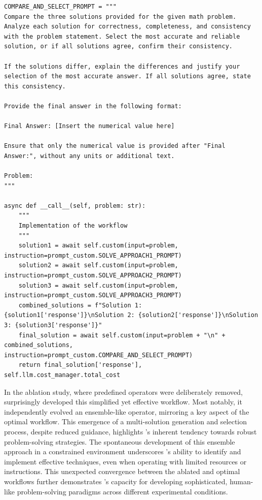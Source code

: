 \begin{tcolorbox}
\begin{verbatim}
COMPARE_AND_SELECT_PROMPT = """
Compare the three solutions provided for the given math problem. Analyze each solution for correctness, completeness, and consistency with the problem statement. Select the most accurate and reliable solution, or if all solutions agree, confirm their consistency.

If the solutions differ, explain the differences and justify your selection of the most accurate answer. If all solutions agree, state this consistency.

Provide the final answer in the following format:

Final Answer: [Insert the numerical value here]

Ensure that only the numerical value is provided after "Final Answer:", without any units or additional text.

Problem:
"""

async def __call__(self, problem: str):
    """
    Implementation of the workflow
    """
    solution1 = await self.custom(input=problem, instruction=prompt_custom.SOLVE_APPROACH1_PROMPT)
    solution2 = await self.custom(input=problem, instruction=prompt_custom.SOLVE_APPROACH2_PROMPT)
    solution3 = await self.custom(input=problem, instruction=prompt_custom.SOLVE_APPROACH3_PROMPT)
    combined_solutions = f"Solution 1: {solution1['response']}\nSolution 2: {solution2['response']}\nSolution 3: {solution3['response']}"
    final_solution = await self.custom(input=problem + "\n" + combined_solutions, instruction=prompt_custom.COMPARE_AND_SELECT_PROMPT)
    return final_solution['response'], self.llm.cost_manager.total_cost
\end{verbatim}
\end{tcolorbox}

In the ablation study, where predefined operators were deliberately removed, \model surprisingly developed this simplified yet effective workflow. Most notably, it independently evolved an ensemble-like operator, mirroring a key aspect of the optimal workflow. This emergence of a multi-solution generation and selection process, despite reduced guidance, highlights \model's inherent tendency towards robust problem-solving strategies. The spontaneous development of this ensemble approach in a constrained environment underscores \model's ability to identify and implement effective techniques, even when operating with limited resources or instructions. This unexpected convergence between the ablated and optimal workflows further demonstrates \model's capacity for developing sophisticated, human-like problem-solving paradigms across different experimental conditions.
